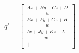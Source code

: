$$
q'=
\begin{bmatrix}
  \frac{Ax + By + Cz + D}{w} \\
  \frac{Ex + Fy + Gz + H}{w} \\
  \frac{Ix + Jy + Kz + L}{w} \\
  1
\end{bmatrix}
$$